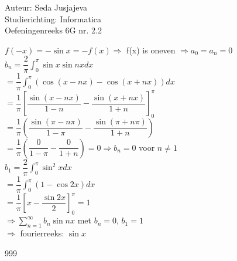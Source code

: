 \documentclass[a4paper]{article}
\newcommand{\integral}{\displaystyle\int}
\begin{document}
\noindent \large Auteur: Seda Jusjajeva\\
\noindent \large Studierichting: Informatica\\
\noindent \large Oefeningenreeks 6G nr. 2.2\\

\medskip

\normalsize


$f(-x) = -\sin x = -f(x) \Rightarrow$  f(x) is oneven $\Rightarrow a_0 = a_n = 0 $\\

$b_n = \dfrac{2}{\pi}\integral_{0}^{\pi}\sin x\sin nxdx$ \\

$= \dfrac{1}{\pi}\integral_{0}^{\pi} (\cos(x - nx) - \cos (x + nx))dx$ \\

$= \dfrac{1}{\pi}\left[\dfrac{\sin (x - nx)}{1-n} - \dfrac{\sin (x + nx)}{1+n}\right]_{0}^{\pi}$\\

$= \dfrac{1}{\pi}\left(\dfrac{\sin (\pi - n\pi)}{1 - \pi} - \dfrac{\sin (\pi + n\pi)}{1 + n}\right)$ \\

$= \dfrac{1}{\pi}\left(\dfrac{0}{1 - \pi} - \dfrac{0}{1 + n}\right) = 0\Rightarrow b_n = 0$ voor $n \neq 1$ \\

$b_1 = \dfrac{2}{\pi}\integral_{0}^{\pi}\sin^2xdx$ \\

$= \dfrac{1}{\pi} \integral_{0}^{\pi} ( 1- \cos2x)dx$ \\

$=\dfrac{1}{\pi}\left[x-\dfrac{\sin 2x}{2}\right]_0^{\pi} = 1$ \\

$\Rightarrow \displaystyle\sum_{n = 1}^\infty b_n\sin nx$ met $b_n = 0$, $b_1 = 1 $ \\

$\Rightarrow$ fourierreeks: $\sin x$


\begin{thebibliography}{999}
\end{thebibliography}
\end{document}
